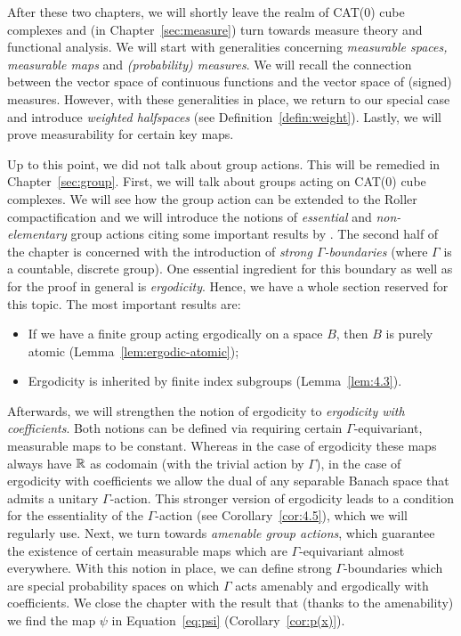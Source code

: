After these two chapters, we will shortly leave the realm of CAT(0) cube complexes and (in Chapter~\ref{sec:measure}) turn towards measure theory and functional analysis. We will start with generalities concerning \emph{measurable spaces, measurable maps} and \emph{(probability) measures}. We will recall the connection between the vector space of continuous functions and the vector space of (signed) measures. However, with these generalities in place, we return to our special case and introduce \emph{weighted halfspaces} (see Definition~\ref{defin:weight}). Lastly, we will prove measurability for certain key maps. 

Up to this point, we did not talk about group actions. This will be remedied in Chapter~\ref{sec:group}. First, we will talk about groups acting on CAT(0) cube complexes. We will see how the group action can be extended to the Roller compactification and we will introduce the notions of \emph{essential} and \emph{non-elementary} group actions citing some important results by \textcite{Caprace2010}. The second half of the chapter is concerned with the introduction of \emph{strong \(\Gamma\)-boundaries} (where \(\Gamma\) is a countable, discrete group). One essential ingredient for this boundary as well as for the proof in general is \emph{ergodicity}. Hence, we have a whole section reserved for this topic. The most important results are:
\begin{itemize}
\item If we have a finite group acting ergodically on a space \(B\), then \(B\) is purely atomic (Lemma~\ref{lem:ergodic-atomic});
\item Ergodicity is inherited by finite index subgroups (Lemma~\ref{lem:4.3}).
\end{itemize}
Afterwards, we will strengthen the notion of ergodicity to \emph{ergodicity with coefficients}. Both notions can be defined via requiring certain \(\Gamma\)-equivariant, measurable maps to be constant. Whereas in the case of ergodicity these maps always have \(\mathbb{R}\) as codomain (with the trivial action by \(\Gamma\)), in the case of ergodicity with coefficients we allow the dual of any separable Banach space that admits a unitary \(\Gamma\)-action. This stronger version of ergodicity leads to a condition for the essentiality of the \(\Gamma\)-action (see Corollary~\ref{cor:4.5}), which we will regularly use. Next, we turn towards \emph{amenable group actions}, which guarantee the existence of certain measurable maps which are \(\Gamma\)-equivariant almost everywhere. With this notion in place, we can define strong \(\Gamma\)-boundaries which are special probability spaces on which \(\Gamma\) acts amenably and ergodically with coefficients. We close the chapter with the result that (thanks to the amenability) we find the map \(\psi\) in Equation~\eqref{eq:psi} (Corollary~\ref{cor:p(x)}).

